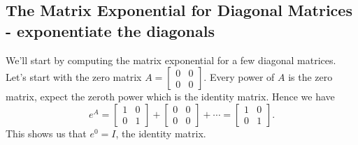 \subsection{The Matrix Exponential for Diagonal Matrices - exponentiate the diagonals}
We'll start by computing the matrix exponential for a few diagonal matrices.  Let's start with the zero matrix
$A=
\begin{bmatrix}
 0 & 0 \\
 0 & 0
	\end{bmatrix}
$. 
 Every power of $A$ is the zero matrix, expect the zeroth power which is the identity matrix.  Hence we have
$$e^A = 
\begin{bmatrix}
 1 & 0 \\
 0 & 1
	\end{bmatrix}
+
\begin{bmatrix}
 0 & 0 \\
 0 & 0
	\end{bmatrix}
+\cdots = 
\begin{bmatrix}
 1 & 0 \\
 0 & 1
	\end{bmatrix}
.$$
This shows us that $e^{0} = I$, the identity matrix.

